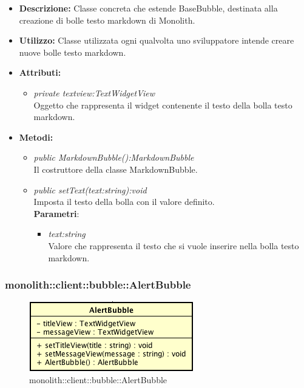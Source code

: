 \begin{itemize}
\item \textbf{Descrizione:} Classe concreta che estende BaseBubble, destinata alla creazione di bolle testo markdown di Monolith.
\item \textbf{Utilizzo:} Classe utilizzata ogni qualvolta uno sviluppatore intende creare nuove bolle testo markdown.
\item \textbf{Attributi:}
\begin{itemize}
\item \textit{private textview:TextWidgetView}\\
Oggetto che rappresenta il widget contenente il testo della bolla testo markdown.
\end{itemize}
\item \textbf{Metodi:}
\begin{itemize}
\item \textit{public MarkdownBubble():MarkdownBubble}\\
Il costruttore della classe MarkdownBubble.
\item \textit{public setText(text:string):void}\\
Imposta il testo della bolla con il valore definito.
\\ \textbf{Parametri}: \begin{itemize}
\item \textit{text:string}\\
Valore che rappresenta il testo che si vuole inserire nella bolla testo markdown.
\end{itemize}
\end{itemize}
\end{itemize}

\subsubsection{monolith::client::bubble::AlertBubble}

\label{monolith::client::bubble::AlertBubble}
\begin{figure}[H]
	\centering
	\includegraphics[scale=0.5]{Sezioni/SottosezioniST/img/AlertBubble.png}
	\caption{monolith::client::bubble::AlertBubble}
\end{figure}


